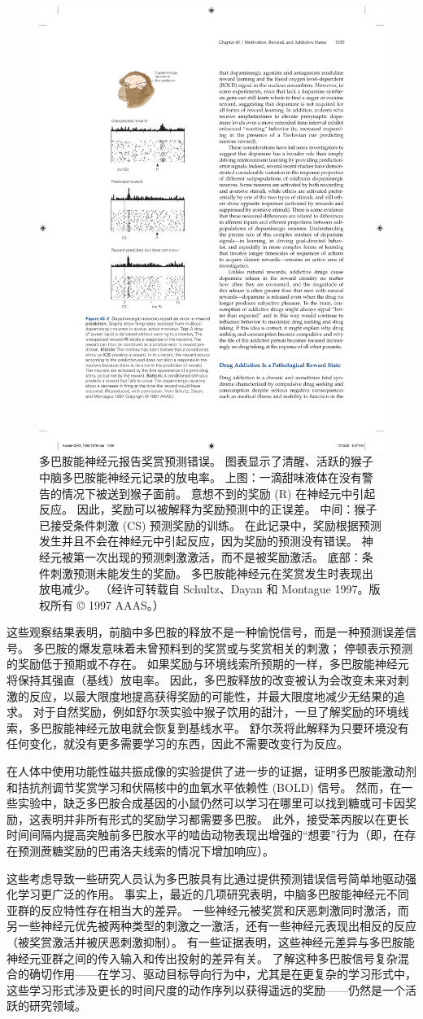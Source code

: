 \begin{figure}[htbp]
	\centering
	\includegraphics[width=0.4\linewidth]{chap43/fig_43_2}
	\caption{多巴胺能神经元报告奖赏预测错误。 图表显示了清醒、活跃的猴子中脑多巴胺能神经元记录的放电率。 上图：一滴甜味液体在没有警告的情况下被送到猴子面前。 意想不到的奖励 (R) 在神经元中引起反应。 因此，奖励可以被解释为奖励预测中的正误差。 中间：猴子已接受条件刺激 (CS) 预测奖励的训练。 在此记录中，奖励根据预测发生并且不会在神经元中引起反应，因为奖励的预测没有错误。 神经元被第一次出现的预测刺激激活，而不是被奖励激活。 底部：条件刺激预测未能发生的奖励。 多巴胺能神经元在奖赏发生时表现出放电减少。 （经许可转载自 Schultz、Dayan 和 Montague 1997。版权所有 © 1997 AAAS。）}
	\label{fig:43_2}
\end{figure}

这些观察结果表明，前脑中多巴胺的释放不是一种愉悦信号，而是一种预测误差信号。 多巴胺的爆发意味着未曾预料到的奖赏或与奖赏相关的刺激； 停顿表示预测的奖励低于预期或不存在。 如果奖励与环境线索所预期的一样，多巴胺能神经元将保持其强直（基线）放电率。 因此，多巴胺释放的改变被认为会改变未来对刺激的反应，以最大限度地提高获得奖励的可能性，并最大限度地减少无结果的追求。 对于自然奖励，例如舒尔茨实验中猴子饮用的甜汁，一旦了解奖励的环境线索，多巴胺能神经元放电就会恢复到基线水平。 舒尔茨将此解释为只要环境没有任何变化，就没有更多需要学习的东西，因此不需要改变行为反应。

在人体中使用功能性磁共振成像的实验提供了进一步的证据，证明多巴胺能激动剂和拮抗剂调节奖赏学习和伏隔核中的血氧水平依赖性 (BOLD) 信号。 然而，在一些实验中，缺乏多巴胺合成基因的小鼠仍然可以学习在哪里可以找到糖或可卡因奖励，这表明并非所有形式的奖励学习都需要多巴胺。 此外，接受苯丙胺以在更长时间间隔内提高突触前多巴胺水平的啮齿动物表现出增强的“想要”行为（即，在存在预测蔗糖奖励的巴甫洛夫线索的情况下增加响应）。

这些考虑导致一些研究人员认为多巴胺具有比通过提供预测错误信号简单地驱动强化学习更广泛的作用。 事实上，最近的几项研究表明，中脑多巴胺能神经元不同亚群的反应特性存在相当大的差异。 一些神经元被奖赏和厌恶刺激同时激活，而另一些神经元优先被两种类型的刺激之一激活，还有一些神经元表现出相反的反应（被奖赏激活并被厌恶刺激抑制）。 有一些证据表明，这些神经元差异与多巴胺能神经元亚群之间的传入输入和传出投射的差异有关。 了解这种多巴胺信号复杂混合的确切作用——在学习、驱动目标导向行为中，尤其是在更复杂的学习形式中，这些学习形式涉及更长的时间尺度的动作序列以获得遥远的奖励——仍然是一个活跃的研究领域。

